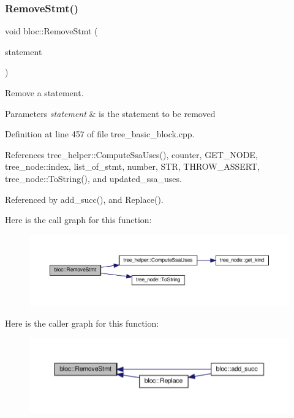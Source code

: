 \subsubsection{\texorpdfstring{Remove\+Stmt()}{RemoveStmt()}}
{\footnotesize\ttfamily void bloc\+::\+Remove\+Stmt (\begin{DoxyParamCaption}\item[{const \hyperlink{tree__node_8hpp_a6ee377554d1c4871ad66a337eaa67fd5}{tree\+\_\+node\+Ref}}]{statement }\end{DoxyParamCaption})}



Remove a statement. 


\begin{DoxyParams}{Parameters}
{\em statement} & is the statement to be removed \\
\hline
\end{DoxyParams}


Definition at line 457 of file tree\+\_\+basic\+\_\+block.\+cpp.



References tree\+\_\+helper\+::\+Compute\+Ssa\+Uses(), counter, G\+E\+T\+\_\+\+N\+O\+DE, tree\+\_\+node\+::index, list\+\_\+of\+\_\+stmt, number, S\+TR, T\+H\+R\+O\+W\+\_\+\+A\+S\+S\+E\+RT, tree\+\_\+node\+::\+To\+String(), and updated\+\_\+ssa\+\_\+uses.



Referenced by add\+\_\+succ(), and Replace().

Here is the call graph for this function\+:
\nopagebreak
\begin{figure}[H]
\begin{center}
\leavevmode
\includegraphics[width=350pt]{d6/df6/structbloc_a9193321bf36b0bcbd263406ea0021ff4_cgraph}
\end{center}
\end{figure}
Here is the caller graph for this function\+:
\nopagebreak
\begin{figure}[H]
\begin{center}
\leavevmode
\includegraphics[width=350pt]{d6/df6/structbloc_a9193321bf36b0bcbd263406ea0021ff4_icgraph}
\end{center}
\end{figure}
\mbox{\label{structbloc_a3f4b8d5c91289b27e92552a962b2567a}} 
